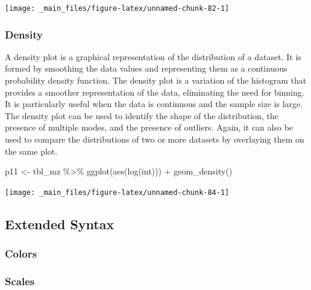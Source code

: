 \documentclass[
]{book}
\newenvironment{Shaded}{\begin{snugshade}}{\end{snugshade}}
\newcommand{\FunctionTok}[1]{\textcolor[rgb]{0.00,0.00,0.00}{#1}}
\newcommand{\NormalTok}[1]{#1}
\newcommand{\OtherTok}[1]{\textcolor[rgb]{0.56,0.35,0.01}{#1}}
\newcommand{\SpecialCharTok}[1]{\textcolor[rgb]{0.00,0.00,0.00}{#1}}
\begin{document}
\begin{center}\texttt{[image: \_main\_files/figure-latex/unnamed-chunk-82-1]} \end{center}

\hypertarget{density}{%
\subsubsection*{Density}\label{density}}

A density plot is a graphical representation of the distribution of a dataset. It is formed by smoothing the data values and representing them as a continuous probability density function. The density plot is a variation of the histogram that provides a smoother representation of the data, eliminating the need for binning. It is particularly useful when the data is continuous and the sample size is large. The density plot can be used to identify the shape of the distribution, the presence of multiple modes, and the presence of outliers. Again, it can also be used to compare the distributions of two or more datasets by overlaying them on the same plot.

\begin{Shaded}
\begin{Highlighting}[]
\NormalTok{p11 }\OtherTok{\textless{}{-}}\NormalTok{ tbl\_mz }\SpecialCharTok{\%\textgreater{}\%} \FunctionTok{ggplot}\NormalTok{(}\FunctionTok{aes}\NormalTok{(}\FunctionTok{log}\NormalTok{(int))) }\SpecialCharTok{+} \FunctionTok{geom\_density}\NormalTok{()}
\end{Highlighting}
\end{Shaded}

\begin{center}\texttt{[image: \_main\_files/figure-latex/unnamed-chunk-84-1]} \end{center}

\hypertarget{extended-syntax}{%
\subsection{Extended Syntax}\label{extended-syntax}}

\hypertarget{colors}{%
\subsubsection{Colors}\label{colors}}

\hypertarget{scales}{%
\subsubsection{Scales}\label{scales}}
\end{document}
